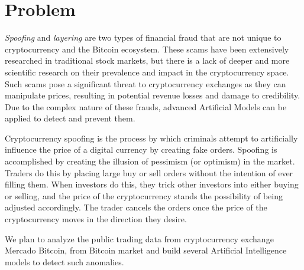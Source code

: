 \section{Problem}
\textit{Spoofing} and \textit{layering} are two types of financial fraud that are not unique to cryptocurrency and the Bitcoin ecosystem. These 
scams have been extensively researched in traditional stock markets, but there is a lack of deeper and more scientific research on their prevalence 
and impact in the cryptocurrency space. Such scams pose a significant threat to cryptocurrency exchanges as they can manipulate prices, resulting 
in potential revenue losses and damage to credibility. Due to the complex nature of these frauds, advanced Artificial Models can be applied to 
detect and prevent them.

Cryptocurrency spoofing is the process by which criminals attempt to artificially influence the price of a digital currency by creating fake 
orders. Spoofing is accomplished by creating the illusion of pessimism (or optimism) in the market. Traders do this by placing large buy or sell 
orders without the intention of ever filling them. When investors do this, they trick other investors into either buying or selling, and the price 
of the cryptocurrency stands the possibility of being adjusted accordingly. The trader cancels the orders once the price of the cryptocurrency 
moves in the direction they desire.

We plan to analyze the public trading data from cryptocurrency exchange Mercado Bitcoin, from Bitcoin market and build several Artificial 
Intelligence models to detect such anomalies.